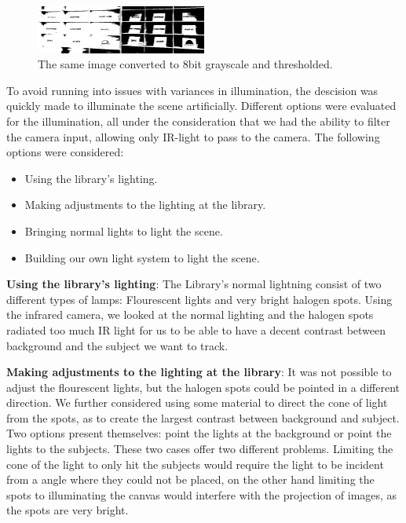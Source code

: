 \begin{figure}[htbp] 
\centering 
\includegraphics[width=0.5\textwidth]{Pictures/HjoerringLibrary/scene_lighting_thresholded.png} 
\caption{The same image converted to 8bit grayscale and thresholded.} 
\label{fig:scene_thresholded} 
\end{figure}

To avoid running into issues with variances in illumination, the descision was quickly made to illuminate the scene artificially. Different options were evaluated for the illumination, all under the consideration that we had the ability to filter the camera input, allowing only IR-light to pass to the camera. The following options were considered:

\begin{itemize}
\item Using the library's lighting.
\item Making adjustments to the lighting at the library.
\item Bringing normal lights to light the scene.
\item Building our own light system to light the scene.
\end{itemize}


\textbf{Using the library's lighting}:
The Library's normal lightning consist of two different types of lamps: Flourescent lights and very bright halogen spots. Using the infrared camera, we looked at the normal lighting and the halogen spots radiated too much IR light for us to be able to have a decent contrast between background and the subject we want to track.

\textbf{Making adjustments to the lighting at the library}:
It was not possible to adjust the flourescent lights, but the halogen spots could be pointed in a different direction. We further considered using some material to direct the cone of light from the spots, as to create the largest contrast between background and subject. Two options present themselves: point the lights at the background or point the lights to the subjects. These two cases offer two different problems. Limiting the cone of the light to only hit the subjects would require the light to be incident from a angle where they could not be placed, on the other hand limiting the spots to illuminating the canvas would interfere with the projection of images, as the spots are very bright.

